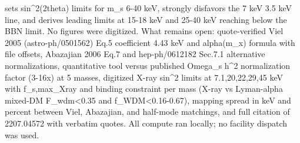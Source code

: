 \documentclass[11pt,a4paper]{article}
\begin{document}
sets sin\textasciicircum{}2(2theta) limits for m\_s 6-40 keV, strongly disfavors the 7 keV 3.5 keV line, and derives leading limits at 15-18 keV and 25-40 keV reaching below the BBN limit. No figures were digitized. What remains open: quote-verified Viel 2005 (astro-ph/0501562) Eq.5 coefficient 4.43 keV and alpha(m\_x) formula with file offsets, Abazajian 2006 Eq.7 and hep-ph/0612182 Sec.7.1 alternative normalizations, quantitative tool versus published Omega\_s h\textasciicircum{}2 normalization factor (3-16x) at 5 masses, digitized X-ray sin\textasciicircum{}2 limits at 7.1,20,22,29,45 keV with f\_s,max\_Xray and binding constraint per mass (X-ray vs Lyman-alpha mixed-DM F\_wdm\textless{}0.35 and f\_WDM\textless{}0.16-0.67), mapping spread in keV and percent between Viel, Abazajian, and half-mode matchings, and full citation of 2207.04572 with verbatim quotes. All compute ran locally; no facility dispatch was used.
\end{document}
